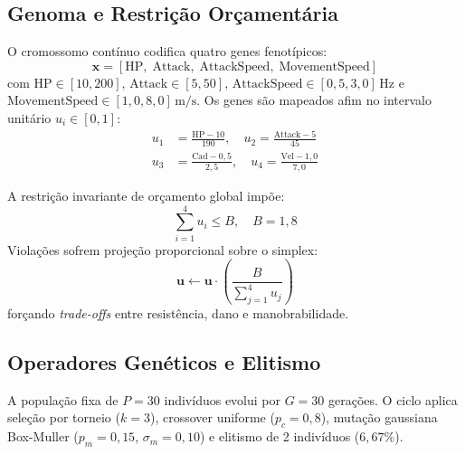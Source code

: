 \documentclass[10pt,conference,twocolumn]{article}
\begin{document}
\subsection{Genoma e Restrição Orçamentária}
O cromossomo contínuo codifica quatro genes fenotípicos:
\begin{equation}
\mathbf{x} = [\text{HP}, \; \text{Attack}, \; \text{AttackSpeed}, \; \text{MovementSpeed}]
\end{equation}
com $\text{HP} \in [10, 200]$, $\text{Attack} \in [5, 50]$, $\text{AttackSpeed} \in [0{,}5, 3{,}0]\,\text{Hz}$ e $\text{MovementSpeed} \in [1{,}0, 8{,}0]\,\text{m/s}$. Os genes são mapeados afim no intervalo unitário $u_i \in [0, 1]$:
\begin{align}
u_1 &= \frac{\text{HP}-10}{190}, \quad u_2 = \frac{\text{Attack}-5}{45} \label{eq:norm_genes1} \\
u_3 &= \frac{\text{Cad}-0{,}5}{2{,}5}, \quad u_4 = \frac{\text{Vel}-1{,}0}{7{,}0} \label{eq:norm_genes2}
\end{align}

A restrição invariante de orçamento global impõe:
\begin{equation}
\sum_{i=1}^4 u_i \le B, \quad B = 1{,}8 \label{eq:budget}
\end{equation}
Violações sofrem projeção proporcional sobre o simplex:
\begin{equation}
\mathbf{u} \leftarrow \mathbf{u} \cdot \left(\frac{B}{\sum_{j=1}^4 u_j}\right)
\end{equation}
forçando \textit{trade-offs} entre resistência, dano e manobrabilidade.

\subsection{Operadores Genéticos e Elitismo}
A população fixa de $P = 30$ indivíduos evolui por $G = 30$ gerações. O ciclo aplica seleção por torneio ($k = 3$), crossover uniforme ($p_c = 0{,}8$), mutação gaussiana Box-Muller ($p_m = 0{,}15$, $\sigma_m = 0{,}10$) e elitismo de 2 indivíduos ($6{,}67\%$).
\end{document}
